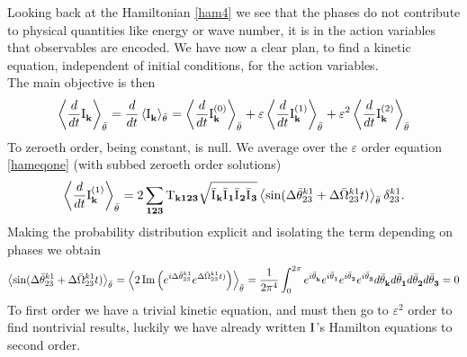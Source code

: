 Looking back at the Hamiltonian \eqref{ham4} we see that the phases do not contribute to physical quantities like energy or wave number, 
it is in the action variables that observables are encoded. We have now a clear plan, to find a kinetic equation, independent of initial conditions, for
the action variables. \\
The main objective is then
\begin{equation}
    \left\langle \frac{d}{dt} \mathrm{I}^{}_\mathbf{k} \right\rangle_{\bar{\theta}^{}} = \frac{d}{dt} \left\langle \mathrm{I}^{}_\mathbf{k} \right\rangle_{\bar{\theta}^{}} = \left\langle \frac{d}{dt} \mathrm{I}^{(0)}_\mathbf{k} \right\rangle_{\bar{\theta}^{}}+
    \varepsilon\left\langle \frac{d}{dt} \mathrm{I}^{(1)}_\mathbf{k} \right\rangle_{\bar{\theta}^{}} + \varepsilon^2\left\langle \frac{d}{dt} \mathrm{I}^{(2)}_\mathbf{k} \right\rangle_{\bar{\theta}^{}} 
    \label{kineticexp}
\end{equation}
To zeroeth order, being constant, is null. We average over the $\varepsilon$ order equation \eqref{hameqone} (with subbed zeroeth order solutions)
\begin{equation}
    \left\langle \frac{d}{dt} \mathrm{I}^{(1)}_\mathbf{k} \right\rangle_{\bar{\theta}^{}} = 2\sum_{\mathbf{123}} \mathrm{T}_{\mathbf{k123}} \sqrt{\bar{\mathrm{I}^{}}_\mathbf{k}\bar{\mathrm{I}^{}}_\mathbf{1}\bar{\mathrm{I}^{}}_\mathbf{2}\bar{\mathrm{I}^{}}_\mathbf{3}} \left\langle\sin(\Delta\bar{\theta}^{k1}_{23} +
    \Delta\bar{\Omega}^{k1}_{23}t)\right\rangle_{\bar{\theta}^{}}\delta^{k1}_{23}.
\end{equation}
Making the probability distribution explicit and isolating the term depending on phases we obtain
\begin{multline}
    \left\langle\sin(\Delta\bar{\theta}^{k1}_{23} + \Delta\bar{\Omega}^{k1}_{23}t)\right\rangle_{\bar{\theta}^{}} = 
    \left\langle 2 \operatorname{Im}\left(e^{i\Delta\bar{\theta}^{k1}_{23}}e^{\Delta\bar{\Omega}^{k1}_{23}t)} \right)   \right\rangle_{\bar{\theta}^{}} = 
    \frac{1}{2\pi^4}\int_{0}^{2\pi}  e^{i\bar{\theta}^{}_\mathbf{k}}e^{i\bar{\theta}^{}_\mathbf{1}}e^{i\bar{\theta}^{}_\mathbf{2}}e^{i\bar{\theta}^{}_\mathbf{3}} d \bar{\theta}^{}_\mathbf{k} d \bar{\theta}^{}_\mathbf{1} d \bar{\theta}^{}_\mathbf{2} d \bar{\theta}^{}_\mathbf{3} = 0
\end{multline}
To first order we have a trivial kinetic equation, and must then go to $\varepsilon^2$ order to find nontrivial results, luckily we have already written $\mathrm{I}^{}$'s 
Hamilton equations to second order. \\

